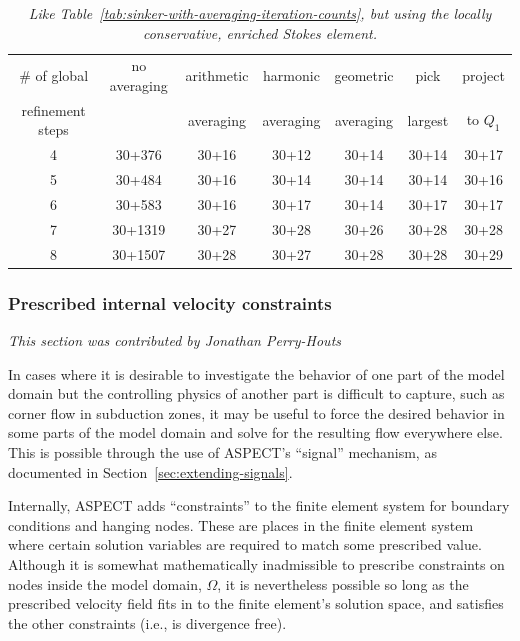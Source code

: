 \documentclass{article}
\newcommand{\aspect}{\textsc{ASPECT}}
\begin{document}
\begin{table}[htb]
  \center
  \begin{tabular}{|c|cccccc|}
    \hline
    \# of global & no averaging & arithmetic & harmonic & geometric
    & pick & project \\
    refinement steps & & averaging & averaging &
    averaging & largest & to $Q_1$
    \\ \hline
    4 & 30+376 & 30+16 & 30+12 & 30+14 & 30+14 & 30+17 \\
    5 & 30+484 & 30+16 & 30+14 & 30+14 & 30+14 & 30+16 \\
    6 & 30+583 & 30+16 & 30+17 & 30+14 & 30+17 & 30+17 \\
    7 & 30+1319 & 30+27 & 30+28 & 30+26 & 30+28 & 30+28 \\
    8 & 30+1507 & 30+28 & 30+27 & 30+28 & 30+28 & 30+29  \\ \hline
  \end{tabular}
  \caption{\it Like Table~\ref{tab:sinker-with-averaging-iteration-counts}, but
  using the locally conservative, enriched Stokes element.}
  \label{tab:sinker-with-averaging-iteration-counts-q2q1iso}
\end{table}


\subsubsection{Prescribed internal velocity constraints}
\label{sec:prescribed-velocities}
\textit{This section was contributed by Jonathan Perry-Houts}

In cases where it is desirable to investigate the behavior of one part of the model
domain but the controlling physics of another part is difficult to capture,
such as corner flow in subduction zones, it may be useful to force the desired
behavior in some parts of the model domain and solve for the resulting flow
everywhere else. This is possible through the use of \aspect{}'s ``signal'' mechanism,
as documented in Section~\ref{sec:extending-signals}.

Internally, \aspect{} adds ``constraints'' to the finite element system for boundary
conditions and hanging nodes. These are places in the finite element system where
certain solution variables are required to match some prescribed value. Although it
is somewhat mathematically inadmissible to prescribe constraints on nodes inside
the model domain, $\Omega$, it is nevertheless possible so long as the prescribed
velocity field fits in to the finite element's solution space, and satisfies the
other constraints (i.e., is divergence free).
\end{document}
